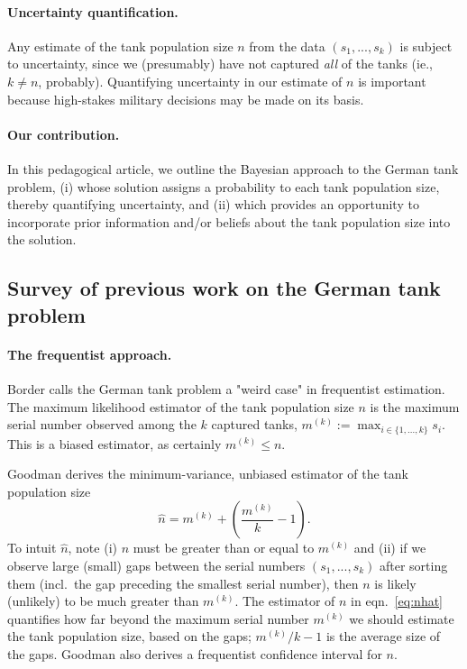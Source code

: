 \documentclass[11pt, oneside]{article}
\newcommand{\data}{$(s_1, ..., s_k)$\xspace}
\begin{document}
\paragraph{Uncertainty quantification.}
Any estimate of the tank population size $n$ from the data \data is subject to uncertainty, since we (presumably) have not captured \emph{all} of the tanks (ie., $k\neq n$, probably).  
Quantifying uncertainty in our estimate of $n$ is important because high-stakes military decisions may be made on its basis.

\paragraph{Our contribution.}
In this pedagogical article, we outline the Bayesian approach to the German tank problem, 
(i) whose solution assigns a probability to each tank population size, thereby quantifying uncertainty, and
(ii) which provides an opportunity to incorporate prior information and/or beliefs about the tank population size into the solution.


\subsection{Survey of previous work on the German tank problem}
\paragraph{The frequentist approach.}
Border \cite{bordernotes} calls the German tank problem a "weird case" in frequentist estimation. The maximum likelihood estimator of the tank population size $n$ is the maximum serial number observed among the $k$ captured tanks, $m^{(k)}:=\max_{i \in \{1, ..., k\}} s_i$. This is a biased estimator, as certainly $m^{(k)} \leq n$.

Goodman \cite{goodman1952serial,goodman1954some} derives the minimum-variance, unbiased estimator of the tank population size
\begin{equation}
	\hat{n} = m^{(k)} + \left(\frac{m^{(k)}}{k}-1 \right). \label{eq:nhat}
\end{equation}
To intuit $\hat{n}$, note (i) $n$ must be greater than or equal to $m^{(k)}$ and (ii) if we observe large (small) gaps between the serial numbers \data after sorting them (incl.\ the gap preceding the smallest serial number), then $n$ is likely (unlikely) to be much greater than $m^{(k)}$. 
The estimator of $n$ in eqn.~\ref{eq:nhat} quantifies how far beyond the maximum serial number $m^{(k)}$ we should estimate the tank population size, based on the gaps; $m^{(k)}/k-1$ is the average size of the gaps.
Goodman also derives a frequentist confidence interval for $n$.
\end{document}
